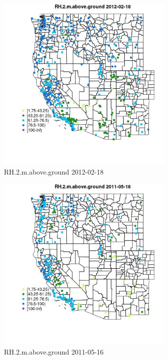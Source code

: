 \begin{figure} 
\centering  
\includegraphics[width=0.77\textwidth]{Code_Outputs/Report_ML_input_PM25_Step4_part_f_de_duplicated_aveswNAs_MapObsRH2maboveground2012-02-18.jpg} 
\caption{\label{fig:Report_ML_input_PM25_Step4_part_f_de_duplicated_aveswNAsMapObsRH2maboveground2012-02-18}RH.2.m.above.ground 2012-02-18} 
\end{figure} 
 

\begin{figure} 
\centering  
\includegraphics[width=0.77\textwidth]{Code_Outputs/Report_ML_input_PM25_Step4_part_f_de_duplicated_aveswNAs_MapObsRH2maboveground2011-05-16.jpg} 
\caption{\label{fig:Report_ML_input_PM25_Step4_part_f_de_duplicated_aveswNAsMapObsRH2maboveground2011-05-16}RH.2.m.above.ground 2011-05-16} 
\end{figure} 
 

